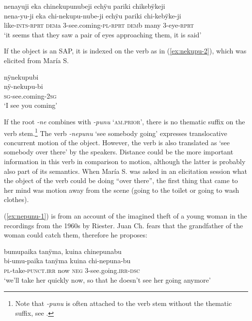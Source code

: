 \newpage

\ea\label{ex:nekupu-1}
\begingl 
\glpreamble nenayuji eka chinekupunubeji echÿu pariki chikebÿkeji\\
\gla nena-yu-ji eka chi-nekupu-nube-ji echÿu pariki chi-kebÿke-ji\\ 
\glb like-\textsc{ints}-\textsc{rprt} \textsc{dem}a 3-see.coming-\textsc{pl}-\textsc{rprt} \textsc{dem}b many 3-eye-\textsc{rprt}\\ 
\glft ‘it seems that they saw a pair of eyes approaching them, it is said’
\trailingcitation{[jxx-p151016l-2]}
\xe

If the object is an SAP, it is indexed on the verb as in (\ref{ex:nekupu-2}), which was elicited from María S.

\ea\label{ex:nekupu-2}
\begingl 
\glpreamble nÿnekupubi\\
\gla nÿ-nekupu-bi\\ 
\textsc{sg}-see.coming-2\textsc{sg}\\ 
\glft ‘I see you coming’
\trailingcitation{[mrx-e150219s.088]}
\xe

If the root \textit{-ne} combines with \textit{-punu} ‘\textsc{am.prior}’, there is no thematic suffix on the verb stem.\footnote{Note that \textit{-punu} is often attached to the verb stem without the thematic suffix, see .} The verb \textit{-nepunu} ‘see somebody going’ expresses translocative concurrent motion of the object. However, the verb is also translated as ‘see somebody over there’ by the speakers. Distance could be the more important information in this verb in comparison to motion, although the latter is probably also part of its semantics. When María S. was asked in an elicitation session what the object of the verb could be doing “over there”, the first thing that came to her mind was motion away from the scene (going to the toilet or going to wash clothes). 

(\ref{ex:nepunu-1}) is from an account of the imagined theft of a young woman in the recordings from the 1960s by Riester. Juan Ch. fears that the grandfather of the woman could catch them, therefore he proposes:

\ea\label{ex:nepunu-1}
\begingl 
\glpreamble bumupaika tanÿma, kuina chinepunabu\\
\gla bi-umu-paika tanÿma kuina chi-nepuna-bu\\ 
\textsc{pl}-take-\textsc{punct.irr} now \textsc{neg} 3-see.going.\textsc{irr}-\textsc{dsc}\\ 
\glft ‘we’ll take her quickly now, so that he doesn’t see her going anymore’
\trailingcitation{[nxx-a630101g-3.066]}
\xe

